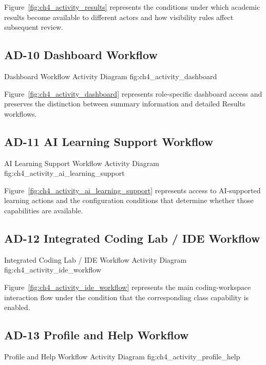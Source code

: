 Figure~\ref{fig:ch4_activity_results} represents the conditions under which
academic results become available to different actors and how visibility rules
affect subsequent review.

\subsection*{AD-10 Dashboard Workflow}

\EduActivityFigureReadable{\EduActivityDashboardWorkflowDiagram}
  {Dashboard Workflow Activity Diagram}
  {fig:ch4_activity_dashboard}

Figure~\ref{fig:ch4_activity_dashboard} represents role-specific dashboard
access and preserves the distinction between summary information and detailed
Results workflows.

\subsection*{AD-11 AI Learning Support Workflow}

\EduActivityFigureReadable{\EduActivityAiLearningSupportWorkflowDiagram}
  {AI Learning Support Workflow Activity Diagram}
  {fig:ch4_activity_ai_learning_support}

Figure~\ref{fig:ch4_activity_ai_learning_support} represents access to
AI-supported learning actions and the configuration conditions that determine
whether those capabilities are available.

\subsection*{AD-12 Integrated Coding Lab / IDE Workflow}

\EduActivityFigure{\EduActivityIdeWorkflowDiagram}
  {Integrated Coding Lab / IDE Workflow Activity Diagram}
  {fig:ch4_activity_ide_workflow}

Figure~\ref{fig:ch4_activity_ide_workflow} represents the main coding-workspace
interaction flow under the condition that the corresponding class capability
is enabled.

\subsection*{AD-13 Profile and Help Workflow}

\EduActivityFigureReadable{\EduActivityProfileHelpWorkflowDiagram}
  {Profile and Help Workflow Activity Diagram}
  {fig:ch4_activity_profile_help}

